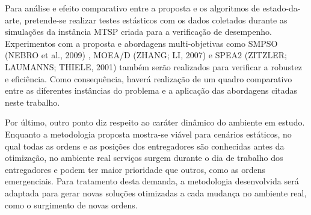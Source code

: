 Para análise e efeito comparativo entre a proposta e os algoritmos de estado-da-arte, pretende-se realizar testes estásticos com os dados coletados durante as simulações da instância MTSP criada para a verificação de desempenho. Experimentos com a proposta e abordagens multi-objetivas como SMPSO (NEBRO et al., 2009) \cite{nebro2009}, MOEA/D (ZHANG; LI, 2007) \cite{zhang2007} e SPEA2 (ZITZLER; LAUMANNS; THIELE, 2001) \cite{zitzler2001} também serão realizados para verificar a robustez e eficiência. Como consequência, haverá realização de um quadro comparativo entre as diferentes instâncias do problema e a aplicação das abordagens citadas neste trabalho.

Por último, outro ponto diz respeito ao caráter dinâmico do ambiente em estudo. Enquanto a metodologia proposta mostra-se viável para cenários estáticos, no qual todas as ordens e as posições dos entregadores são conhecidas antes da otimização, no ambiente real serviços surgem durante o dia de trabalho dos entregadores e podem ter maior prioridade que outros, como as ordens emergenciais. Para tratamento desta demanda, a metodologia desenvolvida será adaptada para gerar novas soluções otimizadas a cada mudança no ambiente real, como o surgimento de novas ordens.